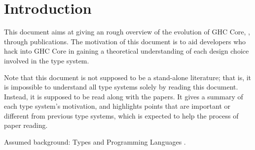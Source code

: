 \section{Introduction}

This document aims at giving an rough overview of the evolution of GHC Core,
\FC, through publications. The motivation of this document is to aid developers
who hack into GHC Core in gaining a theoretical understanding of each design
choice involved in the type system.

Note that this document is not supposed to be a stand-alone literature; that is,
it is impossible to understand all type systems solely by reading this document.
Instead, it is supposed to be read along with the papers. It gives a summary of
each type system's motivation, and highlights points that are important or
different from previous type systems, which is expected to help the process of
paper reading.

Assumed background: Types and Programming Languages \citep{pierce2002types}.

